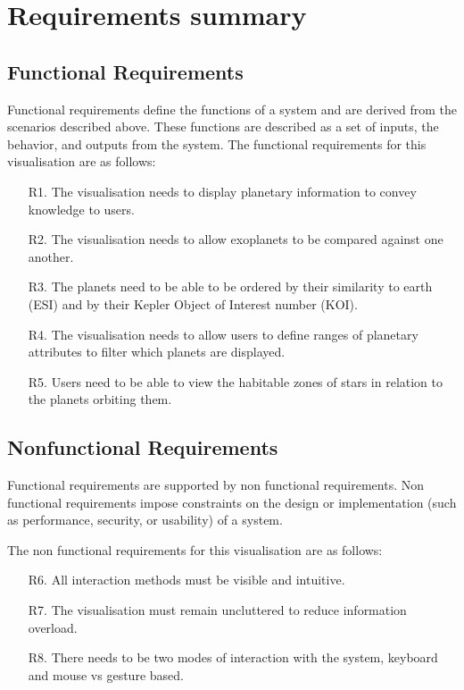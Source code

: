   
\section{Requirements summary}
\subsection{Functional Requirements}
Functional requirements define the functions of a system and are derived from
the scenarios described above. These functions are
described as a set of inputs, the behavior, and outputs from the system. The
functional requirements for this visualisation are as follows:
\begin{enumerate}

 \item[R1.] The visualisation needs to display planetary information to convey
knowledge to
users.

 \item[R2.] The visualisation needs to allow exoplanets to be compared against
one another.

 \item[R3.] The planets need to be able to be ordered by their similarity to
earth (ESI) and by their Kepler Object of Interest number (KOI).
 
 \item[R4.] The visualisation needs to allow users to define ranges of planetary
attributes to filter which planets are displayed.

 \item[R5.] Users need to be able to view the habitable zones of stars in
relation to the planets orbiting them.

\end{enumerate}

\subsection{Nonfunctional Requirements}
 Functional requirements are supported by non functional requirements. Non
functional requirements impose constraints on the design or implementation (such
as performance, security, or usability) of a system.
 
 The non functional requirements for this visualisation are as follows:
\begin{enumerate}
 \item[R6.] All interaction methods must be visible and intuitive.

 \item[R7.] The visualisation must remain uncluttered to reduce information
overload.

 \item[R8.]  There needs to be two modes of interaction with the system,
keyboard and mouse vs gesture based.
\end{enumerate}


